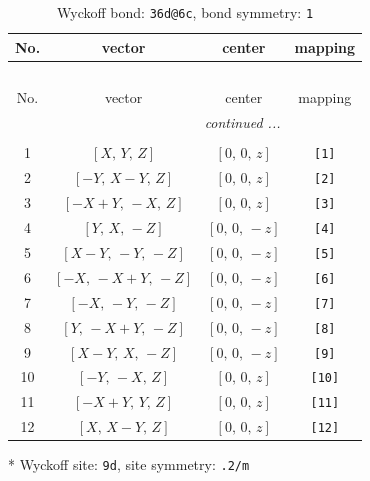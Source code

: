 \documentclass[fleqn,8pt]{jsarticle}
\begin{document}
\begin{longtable}{cccc}
\caption{Wyckoff bond: {\tt 36d@6c}, bond symmetry: {\tt 1}}
 \\
 \hline \hline
No. & vector & center & mapping \\ \hline \endfirsthead

\multicolumn{3}{l}{\tablename\ \thetable{}} \\
 \hline \hline
No. & vector & center & mapping \\ \hline \endhead

 \hline \hline
\multicolumn{3}{r}{\footnotesize\it continued ...} \\ \endfoot

 \hline \hline
\multicolumn{3}{r}{} \\ \endlastfoot

1 & $\left[ X,\, Y,\, Z \right]$ & $\left[ 0,\, 0,\, z \right]$ & {\tt [1]} \\ \hline
2 & $\left[ - Y,\, X - Y,\, Z \right]$ & $\left[ 0,\, 0,\, z \right]$ & {\tt [2]} \\ \hline
3 & $\left[ - X + Y,\, - X,\, Z \right]$ & $\left[ 0,\, 0,\, z \right]$ & {\tt [3]} \\ \hline
4 & $\left[ Y,\, X,\, - Z \right]$ & $\left[ 0,\, 0,\, - z \right]$ & {\tt [4]} \\ \hline
5 & $\left[ X - Y,\, - Y,\, - Z \right]$ & $\left[ 0,\, 0,\, - z \right]$ & {\tt [5]} \\ \hline
6 & $\left[ - X,\, - X + Y,\, - Z \right]$ & $\left[ 0,\, 0,\, - z \right]$ & {\tt [6]} \\ \hline
7 & $\left[ - X,\, - Y,\, - Z \right]$ & $\left[ 0,\, 0,\, - z \right]$ & {\tt [7]} \\ \hline
8 & $\left[ Y,\, - X + Y,\, - Z \right]$ & $\left[ 0,\, 0,\, - z \right]$ & {\tt [8]} \\ \hline
9 & $\left[ X - Y,\, X,\, - Z \right]$ & $\left[ 0,\, 0,\, - z \right]$ & {\tt [9]} \\ \hline
10 & $\left[ - Y,\, - X,\, Z \right]$ & $\left[ 0,\, 0,\, z \right]$ & {\tt [10]} \\ \hline
11 & $\left[ - X + Y,\, Y,\, Z \right]$ & $\left[ 0,\, 0,\, z \right]$ & {\tt [11]} \\ \hline
12 & $\left[ X,\, X - Y,\, Z \right]$ & $\left[ 0,\, 0,\, z \right]$ & {\tt [12]} \\
\end{longtable}
* Wyckoff site: {\tt 9d}, site symmetry: {\tt .2/m}
\renewcommand{\arraystretch}{1.2}
\end{document}
